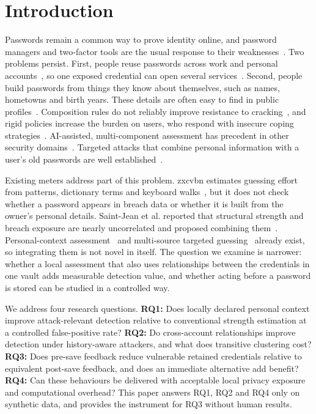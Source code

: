 \documentclass[conference]{IEEEtran}
\begin{document}
\section{Introduction}
Passwords remain a common way to prove identity online, and password managers and two-factor tools are the usual response to their weaknesses~\cite{jubur}. Two problems persist. First, people reuse passwords across work and personal accounts~\cite{aiswarya}, so one exposed credential can open several services~\cite{farcasin}. Second, people build passwords from things they know about themselves, such as names, hometowns and birth years. These details are often easy to find in public profiles~\cite{atzori2024}. Composition rules do not reliably improve resistance to cracking~\cite{he}, and rigid policies increase the burden on users, who respond with insecure coping strategies~\cite{umejiaku2023}. AI-assisted, multi-component assessment has precedent in other security domains~\cite{nebbione}. Targeted attacks that combine personal information with a user's old passwords are well established~\cite{ou2026,mdiguess}.

Existing meters address part of this problem. zxcvbn estimates guessing effort from patterns, dictionary terms and keyboard walks~\cite{wheeler}, but it does not check whether a password appears in breach data or whether it is built from the owner's personal details. Saint-Jean et al. reported that structural strength and breach exposure are nearly uncorrelated and proposed combining them~\cite{saintjean}. Personal-context assessment~\cite{atzori2024,alatawi} and multi-source targeted guessing~\cite{mdiguess} already exist, so integrating them is not novel in itself. The question we examine is narrower: whether a local assessment that also uses relationships between the credentials in one vault adds measurable detection value, and whether acting before a password is stored can be studied in a controlled way.

We address four research questions. \textbf{RQ1:} Does locally declared personal context improve attack-relevant detection relative to conventional strength estimation at a controlled false-positive rate? \textbf{RQ2:} Do cross-account relationships improve detection under history-aware attackers, and what does transitive clustering cost? \textbf{RQ3:} Does pre-save feedback reduce vulnerable retained credentials relative to equivalent post-save feedback, and does an immediate alternative add benefit? \textbf{RQ4:} Can these behaviours be delivered with acceptable local privacy exposure and computational overhead? This paper answers RQ1, RQ2 and RQ4 only on synthetic data, and provides the instrument for RQ3 without human results.
\end{document}
